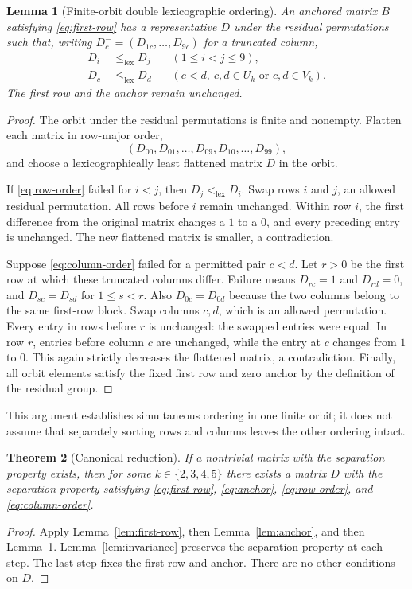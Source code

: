 \documentclass[11pt]{article}
\newtheorem{theorem}{Theorem}[section]
\newtheorem{lemma}[theorem]{Lemma}
\theoremstyle{definition}
\theoremstyle{remark}
\newcommand{\lexle}{\leq_{\mathrm{lex}}}
\newcommand{\lexlt}{<_{\mathrm{lex}}}
\begin{document}
\begin{lemma}[Finite-orbit double lexicographic ordering]
\label{lem:double-lex}
An anchored matrix $B$ satisfying \eqref{eq:first-row} has a
representative $D$ under the residual permutations such that, writing
$D_c^-=(D_{1c},\ldots,D_{9c})$ for a truncated column,
\begin{align}
\label{eq:row-order}
 D_i&\lexle D_j &&(1\leq i<j\leq9),\\
\label{eq:column-order}
 D_c^-&\lexle D_d^-
 &&(c<d,\ c,d\in U_k\text{ or }c,d\in V_k).
\end{align}
The first row and the anchor remain unchanged.
\end{lemma}
\begin{proof}
The orbit under the residual permutations is finite and nonempty.
Flatten each matrix in row-major order,
\[
 (D_{00},D_{01},\ldots,D_{09},D_{10},\ldots,D_{99}),
\]
and choose a lexicographically least flattened matrix $D$ in the orbit.

If \eqref{eq:row-order} failed for $i<j$, then $D_j\lexlt D_i$.
Swap rows $i$ and $j$, an allowed residual permutation. All rows before
$i$ remain unchanged. Within row $i$, the first difference from the
original matrix changes a $1$ to a $0$, and every preceding entry is
unchanged. The new flattened matrix is smaller, a contradiction.

Suppose \eqref{eq:column-order} failed for a permitted pair $c<d$.
Let $r>0$ be the first row at which these truncated columns differ.
Failure means $D_{rc}=1$ and $D_{rd}=0$, and
$D_{sc}=D_{sd}$ for $1\leq s<r$. Also $D_{0c}=D_{0d}$ because the
two columns belong to the same first-row block. Swap columns $c,d$,
which is an allowed permutation. Every entry in rows before $r$ is
unchanged: the swapped entries were equal. In row $r$, entries before
column $c$ are unchanged, while the entry at $c$ changes from $1$ to
$0$. This again strictly decreases the flattened matrix, a
contradiction. Finally, all orbit elements satisfy the fixed first row
and zero anchor by the definition of the residual group.
\end{proof}

This argument establishes simultaneous ordering in one finite orbit;
it does not assume that separately sorting rows and columns leaves
the other ordering intact.

\begin{theorem}[Canonical reduction]
\label{thm:canonical}
If a nontrivial matrix with the separation property exists, then for
some $k\in\{2,3,4,5\}$ there exists a matrix $D$ with the separation
property satisfying \eqref{eq:first-row}, \eqref{eq:anchor},
\eqref{eq:row-order}, and \eqref{eq:column-order}.
\end{theorem}
\begin{proof}
Apply Lemma~\ref{lem:first-row}, then Lemma~\ref{lem:anchor}, and
then Lemma~\ref{lem:double-lex}. Lemma~\ref{lem:invariance}
preserves the separation property at each step. The last step fixes
the first row and anchor. There are no other conditions on $D$.
\end{proof}
\end{document}
